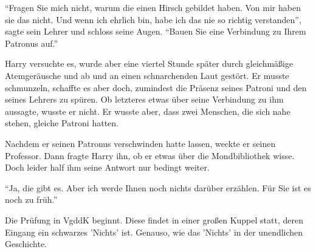 \enquote{Fragen Sie mich nicht, warum die einen Hirsch gebildet haben. Von mir haben sie das nicht. Und wenn ich ehrlich bin, habe ich das nie so richtig verstanden}, sagte sein Lehrer und schloss seine Augen. \enquote{Bauen Sie eine Verbindung zu Ihrem Patronus auf.}

Harry versuchte es, wurde aber eine viertel Stunde später durch gleichmäßige Atemgeräusche und ab und an einen schnarchenden Laut gestört. Er musste schmunzeln, schaffte es aber doch, zumindest die Präsenz seines Patroni und den seines Lehrers zu spüren. Ob letzteres etwas über seine Verbindung zu ihm aussagte, wusste er nicht. Er wusste aber, dass zwei Menschen, die sich nahe stehen, gleiche Patroni hatten.

Nachdem er seinen Patronus verschwinden hatte lassen, weckte er seinen Professor. Dann fragte Harry ihn, ob er etwas über die Mondbibliothek wisse. Doch leider half ihm seine Antwort nur bedingt weiter.

\enquote{Ja, die gibt es. Aber ich werde Ihnen noch nichts darüber erzählen. Für Sie ist es noch zu früh.}




\begin{kommentar}
Die Prüfung in VgddK beginnt. Diese findet in einer großen Kuppel statt, deren Eingang ein schwarzes 'Nichts' ist. Genauso, wie das 'Nichts' in der unendlichen Geschichte.
\end{kommentar}
